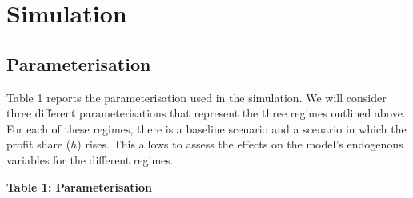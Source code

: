 \documentclass[
  letterpaper,
  DIV=11,
  numbers=noendperiod]{scrreprt}
\begin{document}
\section{Simulation}\label{simulation-5}

\subsection{Parameterisation}\label{parameterisation-5}

Table 1 reports the parameterisation used in the simulation. We will
consider three different parameterisations that represent the three
regimes outlined above. For each of these regimes, there is a baseline
scenario and a scenario in which the profit share (\(h\)) rises. This
allows to assess the effects on the model's endogenous variables for the
different regimes.

\textbf{Table 1: Parameterisation}
\end{document}
